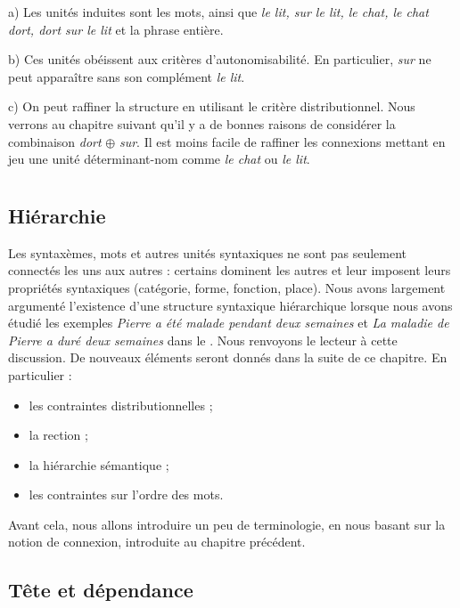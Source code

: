 { a) Les unités induites sont les mots, ainsi que \textit{le lit, sur le lit, le chat, le chat dort, dort sur le lit} et la phrase entière.

b) Ces unités obéissent aux critères d’autonomisabilité. En particulier, \textit{sur} ne peut apparaître sans son complément \textit{le lit}.

c) On peut raffiner la structure en utilisant le critère distributionnel. Nous verrons au chapitre suivant qu’il y a de bonnes raisons de considérer la combinaison \textit{dort} \textrm{${\oplus}$} \textit{sur}. Il est moins facile de raffiner les connexions mettant en jeu une unité déterminant-nom comme \textit{le chat} ou \textit{le lit}.
}
\chapter{}\label{sec:3.3}

\section{Hiérarchie}\label{sec:3.3.0}

Les syntaxèmes, mots et autres unités syntaxiques ne sont pas seulement connectés les uns aux autres : certains dominent les autres et leur imposent leurs propriétés syntaxiques (catégorie, forme, fonction, place). Nous avons largement argumenté l’existence d’une structure syntaxique hiérarchique lorsque nous avons étudié les exemples \textit{Pierre a été malade pendant deux semaines} et \textit{La maladie de Pierre a duré deux semaines} dans le . Nous renvoyons le lecteur à cette discussion. De nouveaux éléments seront donnés dans la suite de ce chapitre. En particulier :

\begin{itemize}
\item les contraintes distributionnelles ;
\item la rection ;
\item la hiérarchie sémantique ;
\item les contraintes sur l’ordre des mots.
\end{itemize}

Avant cela, nous allons introduire un peu de terminologie, en nous basant sur la notion de connexion, introduite au chapitre précédent.

\section{Tête et dépendance}\label{sec:3.3.1}

